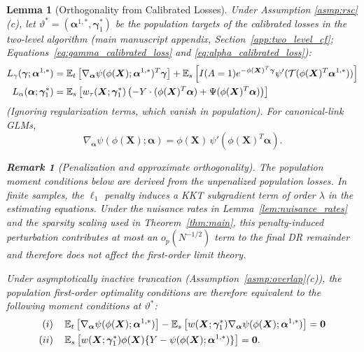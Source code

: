 \documentclass{article}
\newtheorem{lemma}[theorem]{Lemma}
\newtheorem{remark}{Remark}[section]
\begin{document}
\begin{lemma}[Orthogonality from Calibrated Losses]\label{lem:ortho_foc}
Under Assumption \ref{asmp:rsc}(c), let $\vartheta^* = (\boldsymbol{\alpha}^{1,*}, \boldsymbol{\gamma}_1^*)$ be the population targets of the calibrated losses in the two-level algorithm (main manuscript appendix, Section~\ref{app:two_level_cf}; Equations~\eqref{eq:gamma_calibrated_loss} and \eqref{eq:alpha_calibrated_loss}):
\begin{align*}
L_{\gamma}(\boldsymbol{\gamma}; \boldsymbol{\alpha}^{1,*}) &= \operatorname{\mathbb{E}}_t \left[ \nabla_{\boldsymbol{\alpha}} \psi(\phi(\boldsymbol{X}); \boldsymbol{\alpha}^{1,*})^T \boldsymbol{\gamma} \right] + \operatorname{\mathbb{E}}_{s} \left[ I(A=1) e^{-\phi(\boldsymbol{X})^T \boldsymbol{\gamma}} \psi'(\mathcal{T}(\phi(\boldsymbol{X})^T \boldsymbol{\alpha}^{1,*})) \right] \\
L_{\alpha}(\boldsymbol{\alpha}; \boldsymbol{\gamma}_1^*) &= \operatorname{\mathbb{E}}_{s} \left[ w_\tau(\boldsymbol{X}; \boldsymbol{\gamma}_1^*) \left( -Y \cdot (\phi(\boldsymbol{X})^T \boldsymbol{\alpha}) + \Psi(\phi(\boldsymbol{X})^T \boldsymbol{\alpha}) \right) \right]
\end{align*}
(Ignoring regularization terms, which vanish in population). For canonical-link GLMs,
\[
\nabla_{\boldsymbol{\alpha}} \psi(\phi(\boldsymbol{X}); \boldsymbol{\alpha})
= \phi(\boldsymbol{X})\,\psi'(\phi(\boldsymbol{X})^T\boldsymbol{\alpha}).
\]
\begin{remark}[Penalization and approximate orthogonality]
The population moment conditions below are derived from the unpenalized population losses. In finite samples, the $\ell_1$ penalty induces a KKT subgradient term of order $\lambda$ in the estimating equations. Under the nuisance rates in Lemma~\ref{lem:nuisance_rates} and the sparsity scaling used in Theorem~\ref{thm:main}, this penalty-induced perturbation contributes at most an $o_p(N^{-1/2})$ term to the final DR remainder and therefore does not affect the first-order limit theory.
\end{remark}
Under asymptotically inactive truncation (Assumption~\ref{asmp:overlap}(c)), the population first-order optimality conditions are therefore equivalent to the following moment conditions at $\vartheta^*$:
\begin{align*}
(i) \quad & \operatorname{\mathbb{E}}_t\big[\nabla_{\boldsymbol{\alpha}} \psi(\phi(\boldsymbol{X}); \boldsymbol{\alpha}^{1,*})\big]
- \operatorname{\mathbb{E}}_s\left[
    w(\boldsymbol{X};\boldsymbol{\gamma}_1^*)
    \nabla_{\boldsymbol{\alpha}} \psi(\phi(\boldsymbol{X}); \boldsymbol{\alpha}^{1,*})
\right] = \mathbf{0} \\
(ii) \quad & \operatorname{\mathbb{E}}_s\left[
    w(\boldsymbol{X};\boldsymbol{\gamma}_1^*)
    \phi(\boldsymbol{X})
    \{Y - \psi(\phi(\boldsymbol{X}); \boldsymbol{\alpha}^{1,*})\}
\right] = \mathbf{0}.
\end{align*}
\end{lemma}
\end{document}
